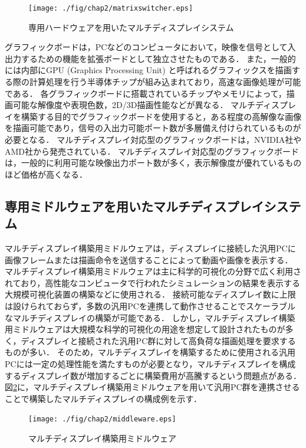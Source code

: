 \begin{figure}[htbp]
 \texttt{[image: ./fig/chap2/matrixswitcher.eps]}
 \caption{専用ハードウェアを用いたマルチディスプレイシステム}
 \label{fig_2.1}
\end{figure}

グラフィックボードは，PCなどのコンピュータにおいて，映像を信号として入出力するための機能を拡張ボードとして独立させたものである．
また，一般的には内部にGPU (Graphics Processing Unit) と呼ばれるグラフィックスを描画する際の計算処理を行う半導体チップが組み込まれており，高速な画像処理が可能である．
各グラフィックボードに搭載されているチップやメモリによって，描画可能な解像度や表現色数，2D/3D描画性能などが異なる．
マルチディスプレイを構築する目的でグラフィックボードを使用すると，ある程度の高解像な画像を描画可能であり，信号の入出力可能ポート数が多層備え付けられているものが必要となる．
マルチディスプレイ対応型のグラフィックボードは，NVIDIA社やAMD社から発売されている．
マルチディスプレイ対応型のグラフィックボードは，一般的に利用可能な映像出力ポート数が多く，表示解像度が優れているものほど価格が高くなる．

\subsection*{専用ミドルウェアを用いたマルチディスプレイシステム}

マルチディスプレイ構築用ミドルウェアは，ディスプレイに接続した汎用PCに画像フレームまたは描画命令を送信することによって動画や画像を表示する．
マルチディスプレイ構築用ミドルウェアは主に科学的可視化の分野で広く利用されており，高性能なコンピュータで行われたシミュレーションの結果を表示する大規模可視化装置の構築などに使用される．
接続可能なディスプレイ数に上限は設けられておらず，多数の汎用PCを連携して動作させることでスケーラブルなマルチディスプレイの構築が可能である．
しかし，マルチディスプレイ構築用ミドルウェアは大規模な科学的可視化の用途を想定して設計されたものが多く，ディスプレイと接続された汎用PC群に対して高負荷な描画処理を要求するものが多い．
そのため，マルチディスプレイを構築するために使用される汎用PCには一定の処理性能を満たすものが必要となり，マルチディスプレイを構成するディスプレイ数が増加するごとに構築費用が高騰するという問題点がある．
図\ref{fig_2.2}に，マルチディスプレイ構築用ミドルウェアを用いて汎用PC群を連携させることで構築したマルチディスプレイの構成例を示す．

\begin{figure}[htbp]
 \texttt{[image: ./fig/chap2/middleware.eps]}
 \caption{マルチディスプレイ構築用ミドルウェア}
 \label{fig_2.2}
\end{figure}

